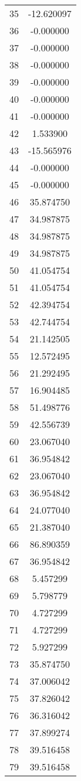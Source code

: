 \documentclass[12pt]{article}
\begin{document}
\begin{longtable}{@{}cc@{}}
35 & -12.620097 \\
36 & -0.000000 \\
37 & -0.000000 \\
38 & -0.000000 \\
39 & -0.000000 \\
40 & -0.000000 \\
41 & -0.000000 \\
42 & 1.533900 \\
43 & -15.565976 \\
44 & -0.000000 \\
45 & -0.000000 \\
46 & 35.874750 \\
47 & 34.987875 \\
48 & 34.987875 \\
49 & 34.987875 \\
50 & 41.054754 \\
51 & 41.054754 \\
52 & 42.394754 \\
53 & 42.744754 \\
54 & 21.142505 \\
55 & 12.572495 \\
56 & 21.292495 \\
57 & 16.904485 \\
58 & 51.498776 \\
59 & 42.556739 \\
60 & 23.067040 \\
61 & 36.954842 \\
62 & 23.067040 \\
63 & 36.954842 \\
64 & 24.077040 \\
65 & 21.387040 \\
66 & 86.890359 \\
67 & 36.954842 \\
68 & 5.457299 \\
69 & 5.798779 \\
70 & 4.727299 \\
71 & 4.727299 \\
72 & 5.927299 \\
73 & 35.874750 \\
74 & 37.006042 \\
75 & 37.826042 \\
76 & 36.316042 \\
77 & 37.899274 \\
78 & 39.516458 \\
79 & 39.516458 \\

\end{longtable}
\end{document}
